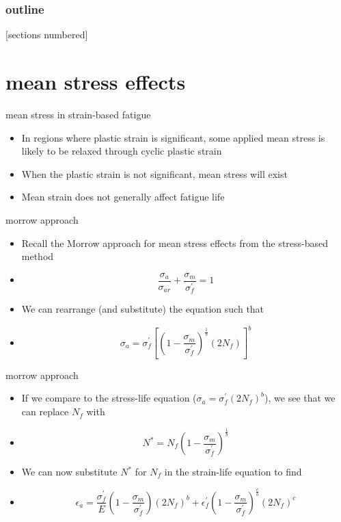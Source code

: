 \documentclass[10pt]{beamer}
\begin{document}
\begin{frame}
  \frametitle{outline}
  [sections numbered]
  \tableofcontents[hideallsubsections]
\end{frame}

\section{mean stress effects}
\begin{frame}{mean stress in strain-based fatigue}
	\begin{itemize}[<+->]
		\item In regions where plastic strain is significant, some applied mean stress is likely to be relaxed through cyclic plastic strain
		\item When the plastic strain is not significant, mean stress will exist
		\item Mean strain does not generally affect fatigue life
	\end{itemize}
\end{frame}

\begin{frame}{morrow approach}
	\begin{itemize}[<+->]
		\item Recall the Morrow approach for mean stress effects from the stress-based method
		\item[]\begin{equation}
		\frac{\sigma_a}{\sigma_{ar}} + \frac{\sigma_m}{\sigma_f^\prime} = 1
		\end{equation}
		\item We can rearrange (and substitute) the equation such that
		\item[]\begin{equation}
		\sigma_a = \sigma_f^\prime\left[\left(1-\frac{\sigma_m}{\sigma_f^\prime}\right)^\frac{1}{b}(2N_f)\right]^b
		\end{equation}
	\end{itemize}
\end{frame}

\begin{frame}{morrow approach}
	\begin{itemize}[<+->]
		\item If we compare to the stress-life equation ($\sigma_a = \sigma_f^\prime(2N_f)^b$), we see that we can replace $N_f$ with
		\item[] \begin{equation}
		\label{eq:nstar}
		N^* = N_f \left(1-\frac{\sigma_m}{\sigma_f^\prime}\right)^\frac{1}{b}
		\end{equation}
		\item We can now substitute $N^*$ for $N_f$ in the strain-life equation to find
		\item[] \begin{equation}
		\epsilon_a = \frac{\sigma_f^\prime}{E} \left(1-\frac{\sigma_m}{\sigma_f^\prime}\right)(2N_f)^b + \epsilon_f^\prime\left(1-\frac{\sigma_m}{\sigma_f^\prime}\right)^\frac{c}{b} (2 N_f)^c
		\end{equation}
	\end{itemize}
\end{frame}
\end{document}
